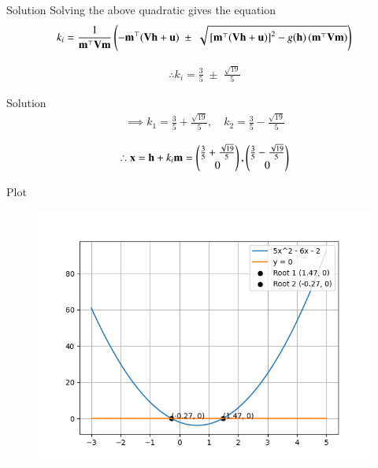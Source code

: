 \documentclass{beamer}
\begin{document}
\begin{frame}{Solution}
Solving the above quadratic gives the equation
\begin{align}
k_i = \frac{1}{\mathbf{m}^{\top}\mathbf{V}\mathbf{m}}
\left(
    -\mathbf{m}^{\top} (\mathbf{V}\mathbf{h} + \mathbf{u})
    \;\pm\;
    \sqrt{ {}\left[\mathbf{m}^{\top}(\mathbf{V}\mathbf{h} + \mathbf{u})\right]^2
    - g(\mathbf{h}) \, (\mathbf{m}^{\top}\mathbf{V}\mathbf{m}) }
    \right)
\end{align}

\begin{align}
\therefore k_i = \frac{3}{5} \;\pm\; \frac{\sqrt{19}}{5}
\end{align}
\end{frame}

\begin{frame}{Solution}
\begin{align}
\implies k_1 = \frac{3}{5} + \frac{\sqrt{19}}{5}, \quad k_2 = \frac{3}{5} - \frac{\sqrt{19}}{5}
\end{align}

\begin{align}
\therefore \mathbf{x} = \mathbf{h} + k_i\mathbf{m} = \begin{pmatrix}\frac{3}{5} + \frac{\sqrt{19}}{5} \\ 0\end{pmatrix} ,  \begin{pmatrix}\frac{3}{5} - \frac{\sqrt{19}}{5} \\ 0\end{pmatrix}
\end{align}

\end{frame}

\begin{frame}{Plot}
\begin{figure}[h!]
    \centering
    \includegraphics[height=0.5\textheight, keepaspectratio]{figs/Figure_1.png}
    \label{figure_1}
\end{figure}
\end{frame}
\end{document}
